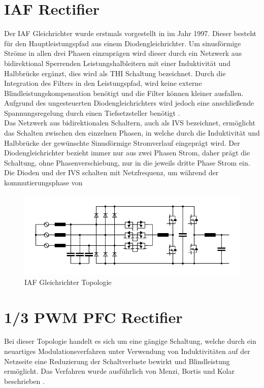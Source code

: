 \section{IAF Rectifier}
Der \gls{IAF} Gleichrichter wurde erstmals vorgestellt in \cite{IAFfirst} im Jahr 1997. Dieser besteht für den Hauptleistungspfad aus einem Diodengleichrichter. Um sinusförmige Ströme in allen drei Phasen einzuprägen wird dieser durch ein Netzwerk aus bidirektional Sperrenden Leistungshalbleitern mit einer Induktivität und Halbbrücke ergänzt, dies wird als \gls{THI} Schaltung bezeichnet. Durch die Integration des Filters in den Leistungspfad, wird keine externe Blindleistungskompensation benötigt und die Filter können kleiner ausfallen. Aufgrund des ungesteuerten Diodengleichrichters wird jedoch eine anschließende Spannungsregelung durch einen Tiefsetzsteller benötigt \cite{ThesisSchrittwieserBuckTypePFC_2017}.\\
Das Netzwerk aus bidirektionalen Schaltern, auch als \gls{IVS} bezeichnet, ermöglicht das Schalten zwischen den einzelnen Phasen, in welche durch die Induktivität und Halbbrücke der gewünschte Sinusförmige Stromverlauf eingeprägt wird. Der Diodengleichrichter bezieht immer nur aus zwei Phasen Strom, daher prägt die Schaltung, ohne Phasenverschiebung, nur in die jeweils dritte Phase Strom ein. Die Dioden und der \gls{IVS} schalten mit Netzfrequenz, um während der kommutierungsphase von 
\begin{figure}
	\centering
	\includegraphics[width=0.9\linewidth]{content/Grafiken/IAF}
	\caption[\gls{IAF} Gleichrichter Topologie]{\gls{IAF} Gleichrichter Topologie}
	\label{fig:iaf}
\end{figure}


\section{1/3 PWM PFC Rectifier}
Bei dieser Topologie handelt es sich um eine gängige Schaltung, welche durch ein neuartiges Modulationsverfahren unter Verwendung von Induktivitäten auf der Netzseite eine Reduzierung der Schaltverluste bewirkt und Blindleistung ermöglicht. Das Verfahren wurde ausführlich von Menzi, Bortis und Kolar beschrieben \cite{13PWMPFC}.



